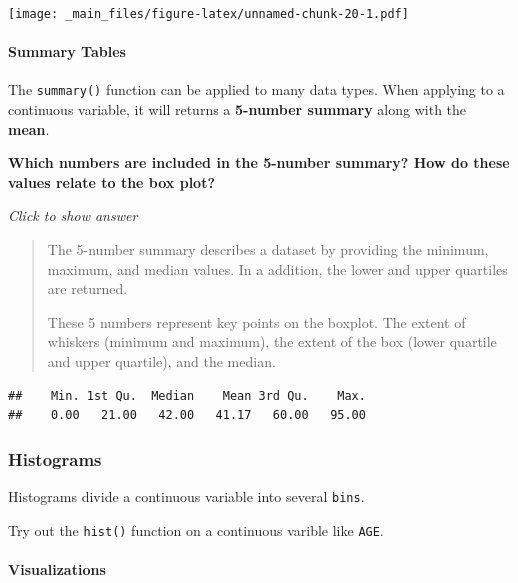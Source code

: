 \documentclass[
]{book}
\newenvironment{Shaded}{\begin{snugshade}}{\end{snugshade}}
\newcommand{\FunctionTok}[1]{\textcolor[rgb]{0.13,0.29,0.53}{\textbf{#1}}}
\newcommand{\NormalTok}[1]{#1}
\newcommand{\SpecialCharTok}[1]{\textcolor[rgb]{0.81,0.36,0.00}{\textbf{#1}}}
\begin{document}
\texttt{[image: \_main\_files/figure-latex/unnamed-chunk-20-1.pdf]}

\hypertarget{summary-tables}{%
\paragraph{Summary Tables}\label{summary-tables}}

The \texttt{summary()} function can be applied to many data types. When applying to a continuous variable, it will returns a \textbf{5-number summary} along with the \textbf{mean}.

\textbf{Which numbers are included in the 5-number summary? How do these values relate to the box plot?}

\emph{Click to show answer}

\begin{quote}
The 5-number summary describes a dataset by providing the minimum, maximum, and median values. In a addition, the lower and upper quartiles are returned.

These 5 numbers represent key points on the boxplot. The extent of whiskers (minimum and maximum), the extent of the box (lower quartile and upper quartile), and the median.
\end{quote}

\begin{Shaded}
\end{Shaded}

\begin{verbatim}
##    Min. 1st Qu.  Median    Mean 3rd Qu.    Max. 
##    0.00   21.00   42.00   41.17   60.00   95.00
\end{verbatim}

\hypertarget{histograms}{%
\subsubsection{Histograms}\label{histograms}}

Histograms divide a continuous variable into several \texttt{bins}.

Try out the \texttt{hist()} function on a continuous varible like \texttt{AGE}.

\hypertarget{visualizations-1}{%
\paragraph{Visualizations}\label{visualizations-1}}
\end{document}
